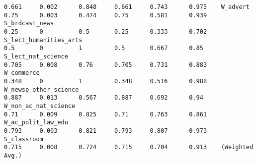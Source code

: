 {\begin{verbatim}
0.661     0.002      0.848     0.661     0.743      0.975    W_advert
0.75      0.003      0.474     0.75      0.581      0.939    S_brdcast_news
0.25      0          0.5       0.25      0.333      0.702    S_lect_humanities_arts
0.5       0          1         0.5       0.667      0.85     S_lect_nat_science
0.705     0.008      0.76      0.705     0.731      0.883    W_commerce
0.348     0          1         0.348     0.516      0.988    W_newsp_other_science
0.887     0.013      0.567     0.887     0.692      0.94     W_non_ac_nat_science
0.71      0.009      0.825     0.71      0.763      0.861    W_ac_polit_law_edu
0.793     0.003      0.821     0.793     0.807      0.973    S_classroom
0.715     0.008      0.724     0.715     0.704      0.913    (Weighted Avg.)
\end{verbatim}
}




